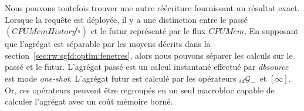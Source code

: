 Nous pouvons toutefois trouver une autre réécriture fournissant un résultat exact. Lorsque la requête est déployée, il y a une distinction entre le passé $(CPUMemHistory^{t_0})$ et le futur représenté par le flux $CPUMem$. En supposant que l'agrégat est séparable par les moyens décrits dans la section~\ref{sec:rw:sgfd:optim:fenetres}, alors nous pouvons séparer les calculs sur le passé et le futur. L'agrégat passé est un calcul instantané effectué par \textit{dbsource} est mode \textit{one-shot}. L'agrégat futur est calculé par les opérateurs $_{id}\mathcal{G}_{...}$ et $[\infty]$. Or, ces opérateurs peuvent être regroupés en un seul macrobloc capable de calculer l'agrégat avec un coût mémoire borné.